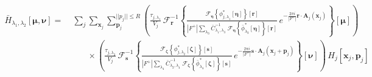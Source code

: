 \documentclass[DM,authoryear,toc]{lsstdoc}
\begin{document}
\begin{align}
    \bar{H}_{\lambda_1,\lambda_2}[\bm{\mu},\bm{\nu}]
    =&\;
    \sum_j \sum_{\bm{x}_j}
    \!\!\!\!
    \sum_{\bm{p}_j}^{||p_j|| \le R}
    \!\!
    \left(
        \frac{\tau_{j,\lambda_1}}{V_j}
        \,
        \mathcal{F}^{-1}_{\bm{r}}\!\left\{
            \frac{
                \mathcal{F}_{\bm{\eta}}\!\left\{
                \phi^*_{j,\lambda_1}\!\left[
                    \bm{\eta}
                \right]
                \right\}\!\left[
                    \bm{r}
                \right]
            }{
                |F^+|
                \sum\limits_{\lambda_3}
                \bar{C}_{\lambda_1,\lambda_3}^{-1}
                \;
                \mathcal{F}_{\bm{\eta}}\!\left\{
                    \bar{\phi}^*_{\lambda_3}[\bm{\eta}]
                \right\}\!\left[
                    \bm{r}
                \right]
            }
            \,
            e^{-\frac{2\pi i}{|F^+|}\bm{r}\cdot\bm{A}_j(\bm{x}_j)}
        \right\}\!\left[
            \bm{\mu}
        \right]
    \right)
    \\
    &\qquad\times
    \left(
        \frac{\tau_{j,\lambda_2}}{V_j}
        \,
        \mathcal{F}^{-1}_{\bm{s}}\!\left\{
            \frac{
                \mathcal{F}_{\bm{\zeta}}\!\left\{
                \phi^*_{j,\lambda_2}\!\left[
                    \bm{\zeta}
                \right]
                \right\}\!\left[
                    \bm{s}
                \right]
            }{
                |F^+|
                \sum\limits_{\lambda_4}
                \bar{C}_{\lambda_2,\lambda_4}^{-1}
                \;
                \mathcal{F}_{\bm{\zeta}}\!\left\{
                    \bar{\phi}^*_{\lambda_4}[\bm{\zeta}]
                \right\}\!\left[
                    \bm{s}
                \right]
            }
            \,
            e^{-\frac{2\pi i}{|F^+|}\bm{s}\cdot\bm{A}_j(\bm{x}_j+\bm{p}_j)}
        \right\}\!\left[
            \bm{\nu}
        \right]
    \right)
    \,
    H_j[\bm{x}_j, \bm{p}_j]
\end{align}
\end{document}
